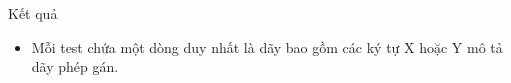 Kết quả
\begin{itemize}
	\item     Mỗi test chứa một dòng duy nhất là dãy bao gồm các ký tự X hoặc Y mô tả dãy phép gán.   
\end{itemize}